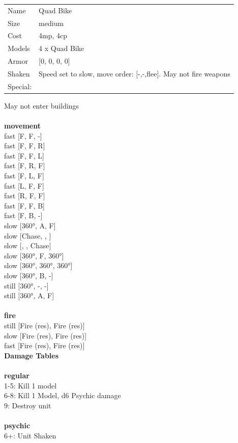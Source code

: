 \begin{tabular}{ll}
  Name & Quad Bike \\
  Size & medium\\
  Cost & 4mp, 4cp\\
  Models & 4 x Quad Bike\\
  Armor & [0, 0, 0, 0]\\
  Shaken & Speed set to slow, move order: [-,-,flee]. May not fire weapons\\
  Special: \\
\end{tabular}

\noindent May not enter buildings\\ 


\ \\ {\bf movement } \\
fast [F, F, -] \\
fast [F, F, R] \\
fast [F, F, L] \\
fast [F, R, F] \\
fast [F, L, F] \\
fast [L, F, F] \\
fast [R, F, F] \\
fast [F, F, B] \\
fast [F, B, -] \\
slow [360°, A, F] \\
slow [Chase, , ] \\
slow [, , Chase] \\
slow [360°, F, 360°] \\
slow [360°, 360°, 360°] \\
slow [360°, B, -] \\
still [360°, -, -] \\
still [360°, A, F] \\
\ \\ {\bf fire } \\
still [Fire (res), Fire (res)] \\
slow [Fire (res), Fire (res)] \\
fast [Fire (res), Fire (res)] \\


{\bf Damage Tables} \\
\ \\ {\bf regular } \\
1-5: Kill 1 model \\
6-8: Kill 1 Model, d6 Psychic damage \\
9: Destroy unit \\
\ \\ {\bf psychic } \\
6+: Unit Shaken \\


